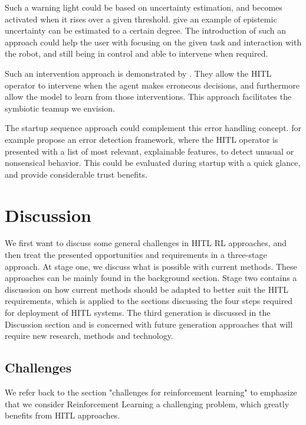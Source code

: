\documentclass[twoside,11pt]{article}
\begin{document}
Such a warning light could be based on uncertainty estimation, and becomes activated when it rises over a given threshold. \citep{JainEtAl:2021:EpistemicUncertaintyPrediction} give an example of epistemic uncertainty can be estimated to a certain degree. The introduction of such an approach could help the user with focusing on the given task and interaction with the robot, and still being in control and able to intervene when required.

Such an intervention approach is demonstrated by \cite{WuEtAl:2021:HITLDRLAutonomousDriving}. They allow the HITL operator to intervene when the agent makes erroneous decisions, and furthermore allow the model to learn from those interventions. This approach facilitates the symbiotic teamup we envision.

The startup sequence approach could complement this error handling concept. \cite{LiuGuoMahmud:2021:HITLErrorDetectionFramework} for example propose an error detection framework, where the HITL operator is presented with a list of most relevant, explainable features, to detect unusual or nonsensical behavior. This could be evaluated during startup with a quick glance, and provide considerable trust benefits.


\section{Discussion}

We first want to discuss some general challenges in HITL RL approaches, and then treat the presented opportunities and requirements in a three-stage approach. At stage one, we discuss what is possible with current methods. These approaches can be mainly found in the background section. Stage two contains a discussion on how current methods should be adapted to better suit the HITL requirements, which is applied to the sections discussing the four steps required for deployment of HITL systems. The third generation is discussed in the Discussion section and is concerned with future generation approaches that will require new research, methods and technology.

\subsection{Challenges}

We refer back to the section "challenges for reinforcement learning" to emphasize that we consider Reinforcement Learning a challenging problem, which greatly benefits from HITL approaches.
\end{document}
